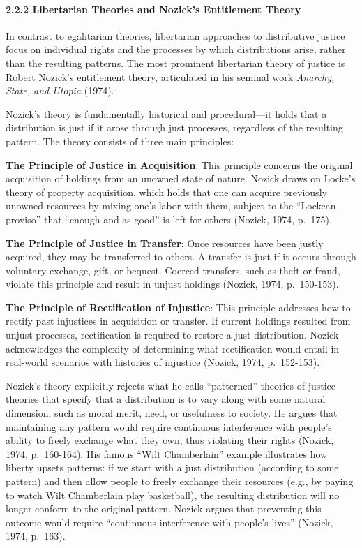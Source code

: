 \paragraph{2.2.2 Libertarian Theories and Nozick's Entitlement
Theory}\label{libertarian-theories-and-nozicks-entitlement-theory}

In contrast to egalitarian theories, libertarian approaches to
distributive justice focus on individual rights and the processes by
which distributions arise, rather than the resulting patterns. The most
prominent libertarian theory of justice is Robert Nozick's entitlement
theory, articulated in his seminal work \emph{Anarchy, State, and
Utopia} (1974).

Nozick's theory is fundamentally historical and procedural---it holds
that a distribution is just if it arose through just processes,
regardless of the resulting pattern. The theory consists of three main
principles:

\textbf{The Principle of Justice in Acquisition}: This principle
concerns the original acquisition of holdings from an unowned state of
nature. Nozick draws on Locke's theory of property acquisition, which
holds that one can acquire previously unowned resources by mixing one's
labor with them, subject to the ``Lockean proviso'' that ``enough and as
good'' is left for others (Nozick, 1974, p.~175).

\textbf{The Principle of Justice in Transfer}: Once resources have been
justly acquired, they may be transferred to others. A transfer is just
if it occurs through voluntary exchange, gift, or bequest. Coerced
transfers, such as theft or fraud, violate this principle and result in
unjust holdings (Nozick, 1974, p.~150-153).

\textbf{The Principle of Rectification of Injustice}: This principle
addresses how to rectify past injustices in acquisition or transfer. If
current holdings resulted from unjust processes, rectification is
required to restore a just distribution. Nozick acknowledges the
complexity of determining what rectification would entail in real-world
scenarios with histories of injustice (Nozick, 1974, p.~152-153).

Nozick's theory explicitly rejects what he calls ``patterned'' theories
of justice---theories that specify that a distribution is to vary along
with some natural dimension, such as moral merit, need, or usefulness to
society. He argues that maintaining any pattern would require continuous
interference with people's ability to freely exchange what they own,
thus violating their rights (Nozick, 1974, p.~160-164). His famous
``Wilt Chamberlain'' example illustrates how liberty upsets patterns: if
we start with a just distribution (according to some pattern) and then
allow people to freely exchange their resources (e.g., by paying to
watch Wilt Chamberlain play basketball), the resulting distribution will
no longer conform to the original pattern. Nozick argues that preventing
this outcome would require ``continuous interference with people's
lives'' (Nozick, 1974, p.~163).

